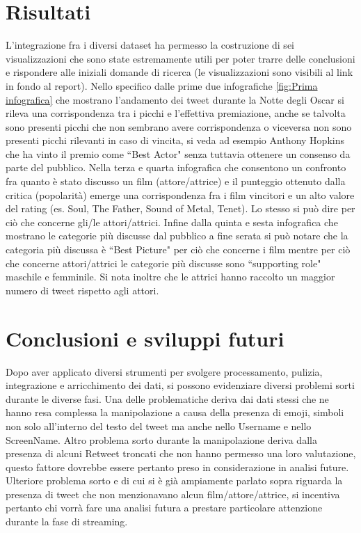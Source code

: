 \documentclass[11pt,a4paper]{report}
\begin{document}
\chapter{Risultati}
L'integrazione fra i diversi dataset ha permesso la costruzione di sei visualizzazioni che sono state estremamente utili per poter trarre delle conclusioni e rispondere alle iniziali domande di ricerca (le visualizzazioni sono visibili al link in fondo al report). Nello specifico dalle prime due infografiche \ref{fig:Prima infografica} che mostrano l'andamento dei tweet durante la Notte degli Oscar si rileva una corrispondenza tra i picchi e l'effettiva premiazione, anche se talvolta sono presenti picchi che non sembrano avere corrispondenza o viceversa non sono presenti picchi rilevanti in caso di vincita, si veda ad esempio Anthony Hopkins che ha vinto il premio come “Best Actor" senza tuttavia ottenere un consenso da parte del pubblico. Nella terza e quarta infografica che consentono un confronto fra quanto è stato discusso un film (attore/attrice) e il punteggio ottenuto dalla critica (popolarità) emerge una corrispondenza fra i film vincitori e un alto valore del rating (es. Soul, The Father, Sound of Metal, Tenet). Lo stesso si può dire per ciò che concerne gli/le attori/attrici. Infine dalla quinta e sesta infografica che mostrano le categorie più discusse dal pubblico a fine serata si può notare che la categoria più discussa è “Best Picture" per ciò che concerne i film mentre per ciò che concerne attori/attrici le categorie più discusse sono “supporting role" maschile e femminile. Si nota inoltre che le attrici hanno raccolto un maggior numero di tweet rispetto agli attori. 


\chapter{Conclusioni e sviluppi futuri}
Dopo aver applicato diversi strumenti per svolgere processamento, pulizia, integrazione e arricchimento dei dati, si possono evidenziare diversi problemi sorti durante le diverse fasi. Una delle problematiche deriva dai dati stessi che ne hanno resa complessa la manipolazione a causa della presenza di emoji, simboli non solo all'interno del testo del tweet ma anche nello Username e nello ScreenName. Altro problema sorto durante la manipolazione deriva dalla presenza di alcuni Retweet troncati che non hanno permesso una loro valutazione, questo fattore dovrebbe essere pertanto preso in considerazione in analisi future. Ulteriore problema sorto e di cui si è già ampiamente parlato sopra riguarda la presenza di tweet che non menzionavano alcun film/attore/attrice, si incentiva pertanto chi vorrà fare una analisi futura a prestare particolare attenzione durante la fase di streaming.




\end{document}
